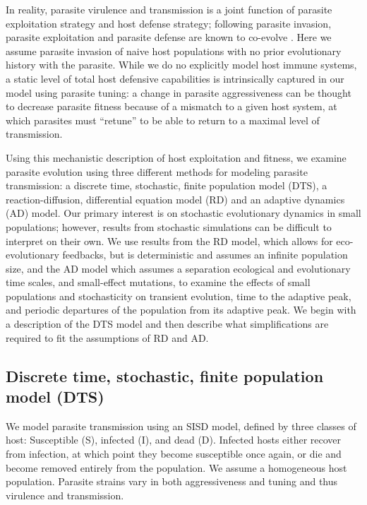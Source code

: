 In reality, parasite virulence and transmission is a joint function of parasite exploitation strategy and host defense strategy; following parasite invasion, parasite exploitation and parasite defense are known to co-evolve \citep{FennerandMarshall1957, CarvalandFerriere2010, Bestetal.2014}. Here we assume parasite invasion of naive host populations with no prior evolutionary history with the parasite. While we do no explicitly model host immune systems, a static level of total host defensive capabilities is intrinsically captured in our model using parasite tuning: a change in parasite aggressiveness can be thought to decrease parasite fitness because of a mismatch to a given host system, at which parasites must ``retune'' to be able to return to a maximal level of transmission. 

Using this mechanistic description of host exploitation and fitness, we examine parasite evolution using three different methods for modeling parasite transmission: a discrete time, stochastic, finite population model (DTS), a reaction-diffusion, differential equation model (RD) and an adaptive dynamics (AD) model. Our primary interest is on stochastic evolutionary dynamics in small populations; however, results from stochastic simulations can be difficult to interpret on their own. We use results from the RD model, which allows for eco-evolutionary feedbacks, but is deterministic and assumes an infinite population size, and the AD model which assumes a separation ecological and evolutionary time scales, and small-effect mutations, to examine the effects of small populations and stochasticity on transient evolution, time to the adaptive peak, and periodic departures of the population from its adaptive peak. We begin with a description of the DTS model and then describe what simplifications are required to fit the assumptions of RD and AD.

\subsection*{Discrete time, stochastic, finite population model (DTS)}

We model parasite transmission using an SISD model, defined by three classes of host: Susceptible (S), infected (I), and dead (D). Infected hosts either recover from infection, at which point they become susceptible once again, or die and become removed entirely from the population. We assume a homogeneous host population. Parasite strains vary in both aggressiveness and tuning and thus virulence and transmission.

